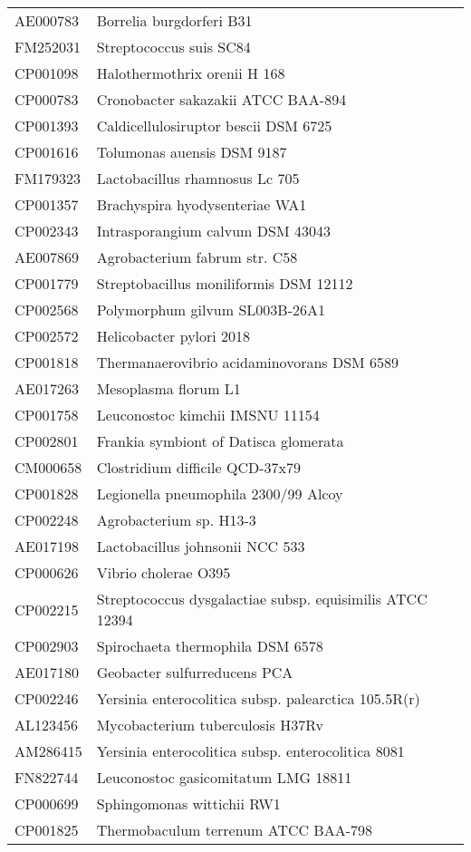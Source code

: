 \begin{longtable}{ll}
AE000783 & Borrelia burgdorferi B31\\
FM252031 & Streptococcus suis SC84\\
CP001098 & Halothermothrix orenii H 168\\
CP000783 & Cronobacter sakazakii ATCC BAA-894\\
CP001393 & Caldicellulosiruptor bescii DSM 6725\\
CP001616 & Tolumonas auensis DSM 9187\\
FM179323 & Lactobacillus rhamnosus Lc 705\\
CP001357 & Brachyspira hyodysenteriae WA1\\
CP002343 & Intrasporangium calvum DSM 43043\\
AE007869 & Agrobacterium fabrum str. C58\\
CP001779 & Streptobacillus moniliformis DSM 12112\\
CP002568 & Polymorphum gilvum SL003B-26A1\\
CP002572 & Helicobacter pylori 2018\\
CP001818 & Thermanaerovibrio acidaminovorans DSM 6589\\
AE017263 & Mesoplasma florum L1\\
CP001758 & Leuconostoc kimchii IMSNU 11154\\
CP002801 & Frankia symbiont of Datisca glomerata\\
CM000658 & Clostridium difficile QCD-37x79\\
CP001828 & Legionella pneumophila 2300/99 Alcoy\\
CP002248 & Agrobacterium sp. H13-3\\
AE017198 & Lactobacillus johnsonii NCC 533\\
CP000626 & Vibrio cholerae O395\\
CP002215 & Streptococcus dysgalactiae subsp. equisimilis ATCC 12394\\
CP002903 & Spirochaeta thermophila DSM 6578\\
AE017180 & Geobacter sulfurreducens PCA\\
CP002246 & Yersinia enterocolitica subsp. palearctica 105.5R(r)\\
AL123456 & Mycobacterium tuberculosis H37Rv\\
AM286415 & Yersinia enterocolitica subsp. enterocolitica 8081\\
FN822744 & Leuconostoc gasicomitatum LMG 18811\\
CP000699 & Sphingomonas wittichii RW1\\
CP001825 & Thermobaculum terrenum ATCC BAA-798\\

\end{longtable}
